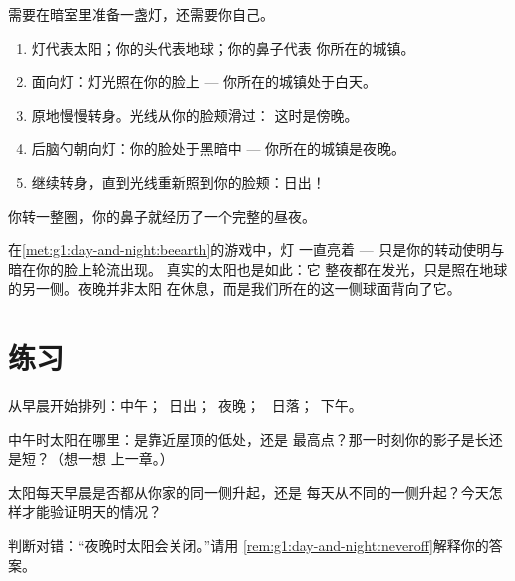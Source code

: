 \begin{method}\label{met:g1:day-and-night:beearth}
需要在暗室里准备一盏灯，还需要你自己。
\begin{enumerate}
  \item 灯代表太阳；你的头代表地球；你的鼻子代表
        你所在的城镇。
  \item 面向灯：灯光照在你的脸上 --- 你所在的城镇处于白天。
  \item 原地慢慢转身。光线从你的脸颊滑过：
        这时是傍晚。
  \item 后脑勺朝向灯：你的脸处于黑暗中 ---
        你所在的城镇是夜晚。
  \item 继续转身，直到光线重新照到你的脸颊：日出！
\end{enumerate}
你转一整圈，你的鼻子就经历了一个完整的昼夜。
\end{method}

\begin{remark}[太阳从不关闭]\label{rem:g1:day-and-night:neveroff}
在\cref{met:g1:day-and-night:beearth}的游戏中，灯
一直亮着 --- 只是你的转动使明与暗在你的脸上轮流出现。
真实的太阳也是如此：它
整夜都在发光，只是照在地球的另一侧。夜晚并非太阳
在休息，而是我们所在的这一侧球面背向了它。
\end{remark}

\section{练习}

\begin{exercise}[$\star$]\label{exo:g1:day-and-night:1}
从早晨开始排列：中午；\ 日出；\ 夜晚；
\ 日落；\ 下午。
\end{exercise}

\begin{exercise}[$\star$]\label{exo:g1:day-and-night:2}
中午时太阳在哪里：是靠近屋顶的低处，还是
最高点？那一时刻你的影子是长还是短？（想一想
上一章。）
\end{exercise}

\begin{exercise}[$\star$]\label{exo:g1:day-and-night:3}
太阳每天早晨是否都从你家的同一侧升起，还是
每天从不同的一侧升起？今天怎样才能验证明天的情况？
\end{exercise}

\begin{exercise}[$\star$]\label{exo:g1:day-and-night:4}
判断对错：“夜晚时太阳会关闭。”请用
\cref{rem:g1:day-and-night:neveroff}解释你的答案。
\end{exercise}

